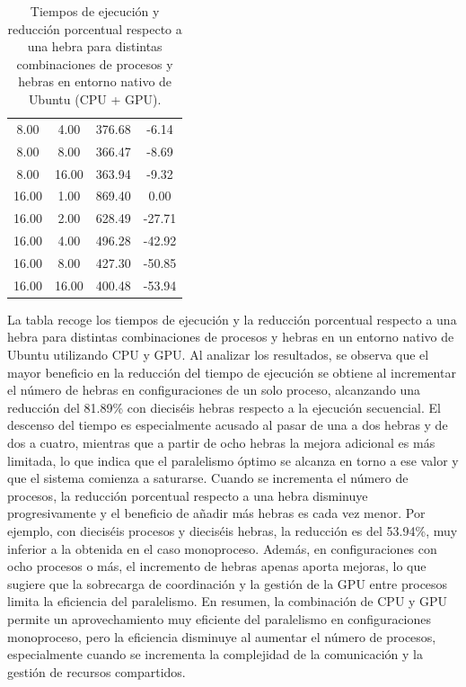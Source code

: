 \begin{table}[ht]
\begin{tabular}{|c|c|c|c|}
        8.00              & 4.00            & 376.68              & -6.14                          \\
        8.00              & 8.00            & 366.47              & -8.69                          \\
        8.00              & 16.00           & 363.94              & -9.32                          \\
        16.00             & 1.00            & 869.40              & 0.00                           \\
        16.00             & 2.00            & 628.49              & -27.71                         \\
        16.00             & 4.00            & 496.28              & -42.92                         \\
        16.00             & 8.00            & 427.30              & -50.85                         \\
        16.00             & 16.00           & 400.48              & -53.94                         \\
        \hline
    \end{tabular}
    \caption{Tiempos de ejecución y reducción porcentual respecto a una hebra para distintas combinaciones de procesos y hebras en entorno nativo de Ubuntu (CPU + GPU).}
    \label{tab:thread_sweep_ubuntu_gpu_native}
\end{table}

La tabla recoge los tiempos de ejecución y la reducción porcentual respecto a una hebra para distintas combinaciones de procesos y hebras en un entorno nativo de Ubuntu utilizando CPU y GPU. Al analizar los resultados, se observa que el mayor beneficio en la reducción del tiempo de ejecución se obtiene al incrementar el número de hebras en configuraciones de un solo proceso, alcanzando una reducción del 81.89\% con dieciséis hebras respecto a la ejecución secuencial. El descenso del tiempo es especialmente acusado al pasar de una a dos hebras y de dos a cuatro, mientras que a partir de ocho hebras la mejora adicional es más limitada, lo que indica que el paralelismo óptimo se alcanza en torno a ese valor y que el sistema comienza a saturarse. Cuando se incrementa el número de procesos, la reducción porcentual respecto a una hebra disminuye progresivamente y el beneficio de añadir más hebras es cada vez menor. Por ejemplo, con dieciséis procesos y dieciséis hebras, la reducción es del 53.94\%, muy inferior a la obtenida en el caso monoproceso. Además, en configuraciones con ocho procesos o más, el incremento de hebras apenas aporta mejoras, lo que sugiere que la sobrecarga de coordinación y la gestión de la GPU entre procesos limita la eficiencia del paralelismo. En resumen, la combinación de CPU y GPU permite un aprovechamiento muy eficiente del paralelismo en configuraciones monoproceso, pero la eficiencia disminuye al aumentar el número de procesos, especialmente cuando se incrementa la complejidad de la comunicación y la gestión de recursos compartidos.

